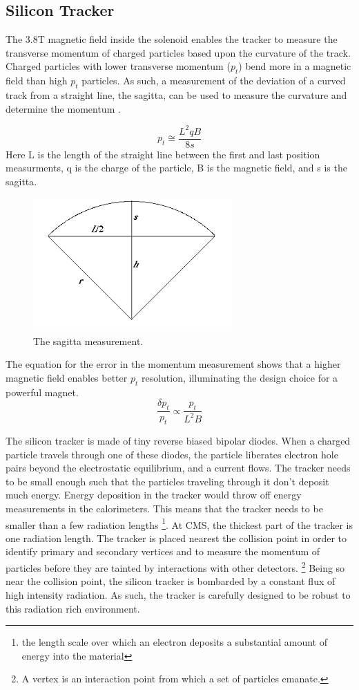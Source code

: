 \subsection{Silicon Tracker}
The 3.8T magnetic field inside the solenoid enables the tracker to measure the transverse momentum of charged particles based upon the curvature of the track. Charged particles with lower transverse momentum ($p_{t}$) bend more in a magnetic field than high $p_{t}$ particles. As such, a measurement of the deviation of a curved track from a straight line, the sagitta, can be used to measure the curvature and determine the momentum \cite{pdgreview}.

\begin{equation}
p_{t} \cong \frac{L^{2}qB}{8s}
\end{equation}
Here L is the length of the straight line between the first and last position measurments, q is the charge of the particle, B is the magnetic field, and s is the sagitta.
\begin{figure}[h!]
  \centering
  \includegraphics[width=3in]{images/sagitta.png}
  \caption[The sagitta measurement.]
   {The sagitta measurement.}
  \label{fig:sagittadrawing}
\end{figure}
The equation for the error in the momentum measurement shows that a higher magnetic field enables better $p_{t}$ resolution, illuminating the design choice for a powerful magnet.
\begin{equation}
\frac{\delta p_{t}}{p_{t}} \propto \frac{p_{t}}{L^{2}B} 
\end{equation}

The silicon tracker is made of tiny reverse biased bipolar diodes. When a charged particle travels through one of these diodes, the particle liberates electron hole pairs beyond the electrostatic equilibrium, and a current flows. The tracker needs to be small enough such that the particles traveling through it don't deposit much energy. Energy deposition in the tracker would throw off energy measurements in the calorimeters. This means that the tracker needs to be smaller than a few radiation lengths \footnote{the length scale over which an electron deposits a substantial amount of energy into the material}. At CMS, the thickest part of the tracker is one radiation length. The tracker is placed nearest the collision point in order to identify primary and secondary vertices and to measure the momentum of particles before they are tainted by interactions with other detectors. \footnote{A vertex is an interaction point from which a set of particles emanate.} Being so near the collision point, the silicon tracker is bombarded by a constant flux of high intensity radiation. As such, the tracker is carefully designed to be robust to this radiation rich environment.

